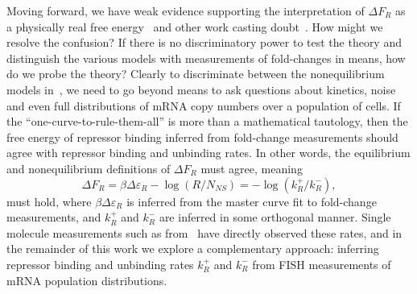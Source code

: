 Moving forward, we have weak evidence supporting the interpretation of $\Delta
F_R$ as a physically real free energy~\cite{Landman2019} and other work casting
doubt~\cite{Hammar2014}. How might we resolve the confusion? If there is no
discriminatory power to test the theory and distinguish the various models with
measurements of fold-changes in means, how do we probe the theory? Clearly to
discriminate between the nonequilibrium models in~, we
need to go beyond means to ask questions about kinetics, noise and even full
distributions of mRNA copy numbers over a population of cells. If the
``one-curve-to-rule-them-all'' is more than a mathematical tautology, then the
free energy of repressor binding inferred from fold-change measurements should
agree with repressor binding and unbinding rates. In other words, the
equilibrium and nonequilibrium definitions of $\Delta F_R$ must agree, meaning
\begin{equation}
\Delta F_R = \beta\Delta\varepsilon_R - \log(R/N_{NS})
        = - \log(k_R^+/k_R^-),
\label{eq:deltaFR_eq_noneq_equiv}
\end{equation}
must hold, where $\beta\Delta\varepsilon_R$ is inferred from the master curve
fit to fold-change measurements, and $k_R^+$ and $k_R^-$ are inferred in some
orthogonal manner. Single molecule measurements such as from~\cite{Hammar2014}
have directly observed these rates, and in the remainder of this work we explore
a complementary approach: inferring repressor binding and unbinding rates
$k_R^+$ and $k_R^-$ from FISH measurements of mRNA population distributions.
